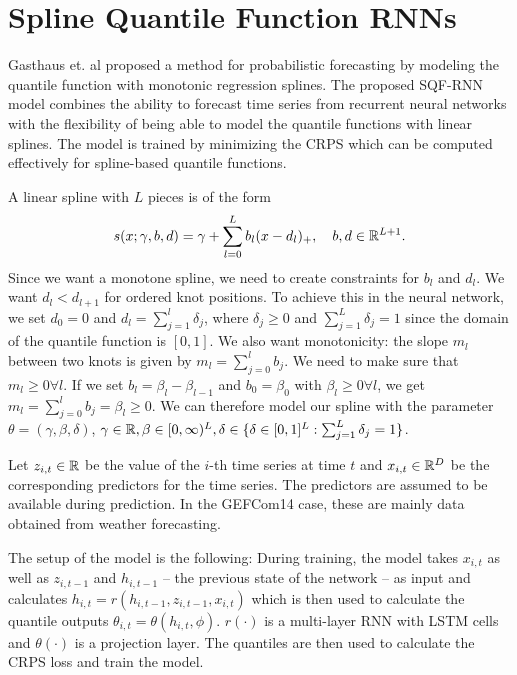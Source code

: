 \section{Spline Quantile Function RNNs}
\label{sec:sqf-rnn}

Gasthaus et. al proposed a method for probabilistic forecasting by modeling 
the quantile function with monotonic regression splines. 
The proposed SQF-RNN model combines the ability to forecast time series 
from recurrent neural networks with the flexibility of being able to 
model the quantile functions with linear splines. 
The model is trained by minimizing the CRPS which can be computed effectively 
for spline-based quantile functions.

A linear spline with \(L\) pieces is of the form 
\[ s(x; \gamma, b, d) = \gamma + \sum_{l=0}^L b_l (x - d_l)_+, 
\quad b, d \in \mathbb{R}^{L+1}. \]
Since we want a monotone spline, we need to create constraints for \(b_l\) and \(d_l\).
We want \(d_l < d_{l+1}\) for ordered knot positions. To achieve this 
in the neural network, we set \(d_0 = 0\) and \(d_l = \sum_{j=1}^l \delta_j\), 
where \(\delta_j \geq 0\) and \(\sum_{j=1}^L \delta_j = 1\) since the domain 
of the quantile function is \([0, 1]\). 
We also want monotonicity: the slope \(m_l\) between two knots is given by 
\(m_l = \sum_{j=0}^l b_j\). We need to make sure that \(m_l \geq 0 \forall l\).
If we set \(b_l = \beta_l - \beta_{l-1}\) and \(b_0 = \beta_0\) with \(\beta_l \geq 0 \forall l\), 
we get \(m_l = \sum_{j=0}^l b_j = \beta_l \geq 0\).
We can therefore model our spline with the parameter 
\(\theta = (\gamma, \beta, \delta)\), \(\gamma \in \mathbb{R}, \beta \in [0,\infty)^{L}, 
\delta \in \{ \delta \in [0,1]^L: \sum_{j=1}^L \delta_j = 1 \}\).

Let \(z_{i,t} \in \mathbb{R}\) be the value of the \(i\)-th time series at time \(t\) and 
\(x_{i,t} \in \mathbb{R}^D\) be the corresponding predictors for the time series. 
The predictors are assumed to be available during prediction. In the 
GEFCom14 case, these are mainly data obtained from weather forecasting. 

The setup of the model is the following: 
During training, the model takes \(x_{i,t}\) as well as \(z_{i, t-1}\) 
and \(h_{i, t-1}\) -- the previous state of the network -- 
as input and calculates \(h_{i,t} = r(h_{i, t-1}, z_{i, t-1}, x_{i, t})\)
which is then used to calculate the quantile outputs 
\(\theta_{i,t} = \theta(h_{i,t}, \phi)\).
\(r(\cdot)\) is a multi-layer RNN with LSTM cells and \(\theta(\cdot)\) 
is a projection layer.
The quantiles are then used to calculate the CRPS loss and train the model.

